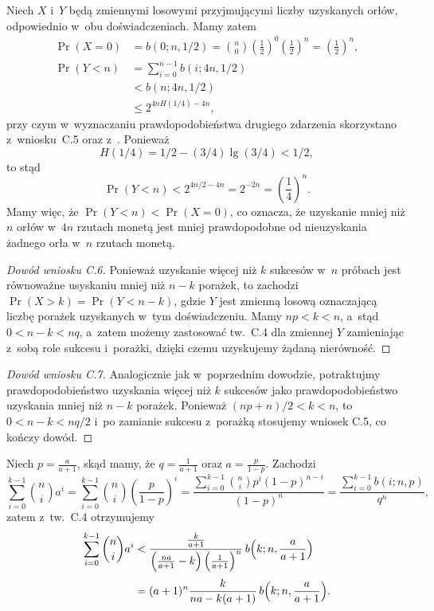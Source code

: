 \exercise{} %
Niech $X$ i~$Y$ będą zmiennymi losowymi przyjmującymi liczby uzyskanych orłów, odpowiednio w~obu doświadczeniach. Mamy zatem
\begin{align*}
	\Pr(X=0) &= b(0;n,1/2) = \binom{n}{0}\left(\frac{1}{2}\right)^0\left(\frac{1}{2}\right)^n = \left(\frac{1}{2}\right)^n, \\
	\Pr(Y<n) &= \sum_{i=0}^{n-1}b(i;4n,1/2) \\[1mm]
	&< b(n;4n,1/2) \\[1mm]
	&\le 2^{4nH(1/4)-4n},
\end{align*}
przy czym w~wyznaczaniu prawdopodobieństwa drugiego zdarzenia skorzystano z~wniosku~C.5 oraz z~. Ponieważ
\[
	H(1/4) = 1/2-(3/4)\lg(3/4) < 1/2,
\]
to stąd
\[
	\Pr(Y<n) < 2^{4n/2-4n} = 2^{-2n} = \left(\frac{1}{4}\right)^n.
\]
Mamy więc, że $\Pr(Y<n)<\Pr(X=0)$, co oznacza, że uzyskanie mniej niż $n$ orłów w~$4n$ rzutach monetą jest mniej prawdopodobne od nieuzyskania żadnego orła w~$n$ rzutach monetą.

\exercise{} %
\begin{proof}[Dowód wniosku C.6]
	Ponieważ uzyskanie więcej niż $k$ sukcesów w~$n$ próbach jest równoważne usyskaniu mniej niż $n-k$ porażek, to zachodzi $\Pr(X>k)=\Pr(Y<n-k)$, gdzie $Y$ jest zmienną losową oznaczającą liczbę porażek uzyskanych w~tym doświadczeniu. Mamy $np<k<n$, a~stąd $0<n-k<nq$, a~zatem możemy zastosować tw.~C.4 dla zmiennej $Y$ zamieniając z~sobą role sukcesu i~porażki, dzięki czemu uzyskujemy żądaną nierówność.
\end{proof}

\begin{proof}[Dowód wniosku C.7]
	Analogicznie jak w~poprzednim dowodzie, potraktujmy prawdopodobieństwo uzyskania więcej niż $k$ sukcesów jako prawdopodobieństwo uzyskania mniej niż $n-k$ porażek. Ponieważ $(np+n)/2<k<n$, to $0<n-k<nq/2$ i~po zamianie sukcesu z~porażką stosujemy wniosek C.5, co kończy dowód.
\end{proof}

\exercise{} %
Niech $p=\frac{a}{a+1}$, skąd mamy, że $q=\frac{1}{a+1}$ oraz $a=\frac{p}{1-p}$. Zachodzi
\[
	\sum_{i=0}^{k-1}\binom{n}{i}a^i = \sum_{i=0}^{k-1}\binom{n}{i}\left(\frac{p}{1-p}\right)^i = \frac{\sum_{i=0}^{k-1}\binom{n}{i}p^i(1-p)^{n-i}}{(1-p)^n} = \frac{\sum_{i=0}^{k-1}b(i;n,p)}{q^n},
\]
zatem z~tw.~C.4 otrzymujemy
\begin{align*}
	\sum_{i=0}^{k-1}\binom{n}{i}a^i &< \frac{\frac{k}{a+1}}{\left(\frac{na}{a+1}-k\right)\left(\frac{1}{a+1}\right)^n}\,b\Bigl(k;n,\frac{a}{a+1}\Bigr) \\[1mm]
	&= (a+1)^n\frac{k}{na-k(a+1)}\,b\Bigl(k;n,\frac{a}{a+1}\Bigr).
\end{align*}

